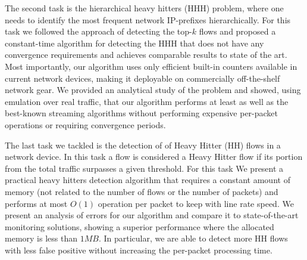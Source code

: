 {The second task is the hierarchical heavy hitters (HHH) problem, where one needs to identify the most frequent network IP-prefixes hierarchically. For this task we followed the approach of detecting the top-$k$ flows and proposed a constant-time algorithm for detecting the HHH that does not have any convergence requirements and achieves comparable results to state of the art.
Most importantly, our algorithm uses only efficient built-in counters available in current network devices, making it deployable on commercially off-the-shelf network gear.
We provided an analytical study of the problem and showed, using emulation over real traffic, that our algorithm performs at least as well as the best-known streaming algorithms without performing expensive per-packet operations or requiring convergence periods.

The last task we tackled is the detection of of Heavy Hitter (HH) flows in a network device. In this task a flow is considered a Heavy Hitter flow if its portion from the total traffic surpasses a given threshold. For this task We present a practical heavy hitters detection algorithm that requires a constant amount of memory (not related to the number of flows or the number of packets) and performs at most $O(1)$ operation per packet to keep with line rate speed. We present an analysis of errors for our algorithm and compare it to state-of-the-art monitoring solutions, showing a superior performance where the allocated memory is less than $1MB$. In particular, we are able to detect more HH flows with less false positive without increasing the per-packet processing time.

} %


